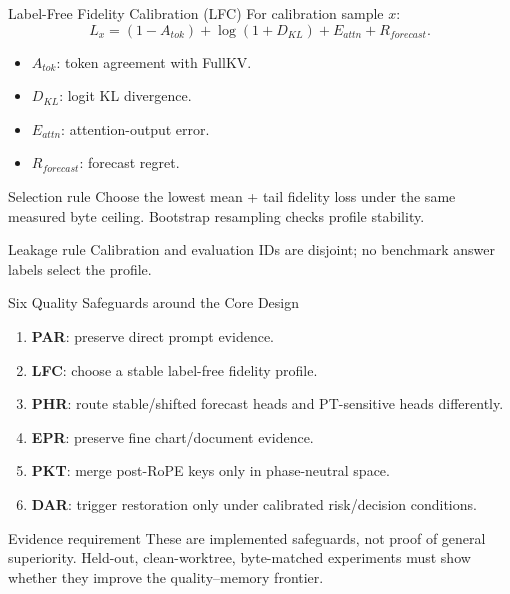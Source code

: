 \documentclass[aspectratio=169,10pt]{beamer}
\newcommand{\tightitems}{\setlength{\itemsep}{0.28em}\setlength{\parskip}{0pt}}
\begin{document}
\begin{frame}{Label-Free Fidelity Calibration (LFC)}
\small
For calibration sample $x$:
\[
L_x=(1-A_{tok})+\log(1+D_{KL})+E_{attn}+R_{forecast}.
\]
\begin{itemize}\tightitems
  \item $A_{tok}$: token agreement with FullKV.
  \item $D_{KL}$: logit KL divergence.
  \item $E_{attn}$: attention-output error.
  \item $R_{forecast}$: forecast regret.
\end{itemize}
\begin{block}{Selection rule}
Choose the lowest mean + tail fidelity loss under the same measured byte ceiling. Bootstrap
resampling checks profile stability.
\end{block}
\begin{alertblock}{Leakage rule}
Calibration and evaluation IDs are disjoint; no benchmark answer labels select the profile.
\end{alertblock}
\end{frame}

\begin{frame}{Six Quality Safeguards around the Core Design}
\scriptsize
\begin{enumerate}\tightitems
  \item \textbf{PAR}: preserve direct prompt evidence.
  \item \textbf{LFC}: choose a stable label-free fidelity profile.
  \item \textbf{PHR}: route stable/shifted forecast heads and PT-sensitive heads differently.
  \item \textbf{EPR}: preserve fine chart/document evidence.
  \item \textbf{PKT}: merge post-RoPE keys only in phase-neutral space.
  \item \textbf{DAR}: trigger restoration only under calibrated risk/decision conditions.
\end{enumerate}
\begin{alertblock}{Evidence requirement}
These are implemented safeguards, not proof of general superiority. Held-out, clean-worktree,
byte-matched experiments must show whether they improve the quality--memory frontier.
\end{alertblock}
\end{frame}
\end{document}
